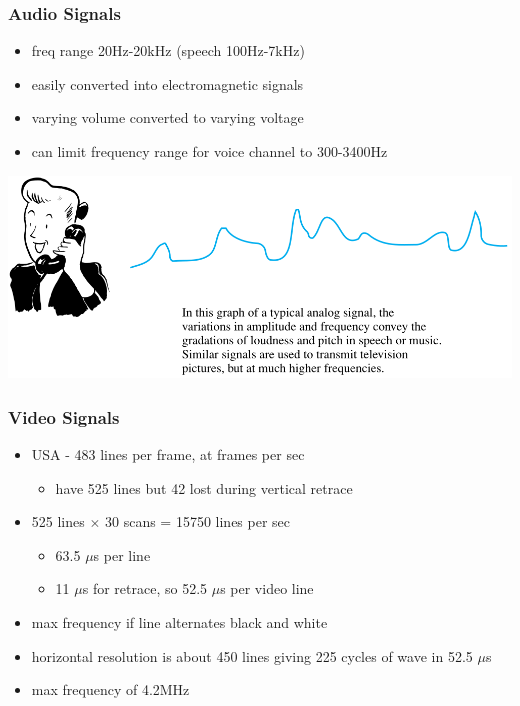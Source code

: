 \documentclass[pdflatex,compress]{beamer}
\begin{document}
\begin{frame}
	\frametitle{Audio Signals}
	\begin{itemize}
		\item freq range 20Hz-20kHz (speech 100Hz-7kHz)
		\item easily converted into electromagnetic signals
		\item varying volume converted to varying voltage
		\item can limit frequency range for voice channel to 300-3400Hz
	\end{itemize}
	\begin{center}
		\includegraphics[width=\linewidth]{img/img07}
	\end{center}
\end{frame}

\begin{frame}
	\frametitle{Video Signals}
	\begin{itemize}
		\item USA - 483 lines per frame, at frames per sec
		\begin{itemize}
			\item have 525 lines but 42 lost during vertical retrace
		\end{itemize}
		\item 525 lines $\times$ 30 scans = 15750 lines per sec
		\begin{itemize}
			\item 63.5 $\mu$s per line
			\item 11 $\mu$s for retrace, so 52.5 $\mu$s per video line
		\end{itemize}
		\item max frequency if line alternates black and white
		\item horizontal resolution is about 450 lines giving 225 cycles of wave in 52.5 $\mu$s
		\item max frequency of 4.2MHz
	\end{itemize}
\end{frame}
\end{document}
